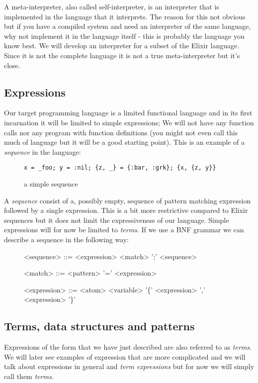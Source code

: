 \documentclass[a4paper,11pt]{article}
\begin{document}
A meta-interpreter, also called self-interpreter, is an interpreter
that is implemented in the language that it interprets. The reason for
this not obvious but if you have a compiled system and need an
interpreter of the same language, why not implement it in the language
itself - this is probably the language you know best. We will develop
an interpreter for a subset of the Elixir language. Since it is not the
complete language it is not a true meta-interpreter but it's close.

\subsection{Expressions}
Our target programming language is a limited functional language and
in its first incarnation it will be limited to simple expressions; We
will not have any function calls nor any program with function
definitions (you might not even call this much of language but it will
be a good starting point). This is an example of a {\em sequence} in
the language:

\begin{figure}[h]
\begin{verbatim}
x = _foo; y = :nil; {z, _} = {:bar, :grk}; {x, {z, y}}
\end{verbatim}
\caption{a simple sequence}
\label{fig:sequence}
\end{figure}

A {\em sequence} consist of a, possibly empty, sequence of pattern
matching expression followed by a single expression. This is a bit
more restrictive compared to Elixir sequences but it does not limit
the expressiveness of our language. Simple expressions will for now be
limited to {\em terms}. If we use a BNF grammar we can describe a
sequence in the following way:

\begin{figure}[h]
\begin{grammar}
<sequence> ::= <expression> \alt <match> ';' <sequence>

<match> ::= <pattern> '=' <expression> 

<expression> ::= <atom> \alt <variable> \alt '\{' <expression> ',' <expression> '\}'
\end{grammar}
\end{figure}

\subsection{Terms, data structures and patterns}
Expressions of the form that we have just described are also referred
to as {\em terms}. We will later see examples of expression that are
more complicated and we will talk about expressions in general and
{\em term expressions} but for now we will simply call them {\em terms}.
\end{document}
